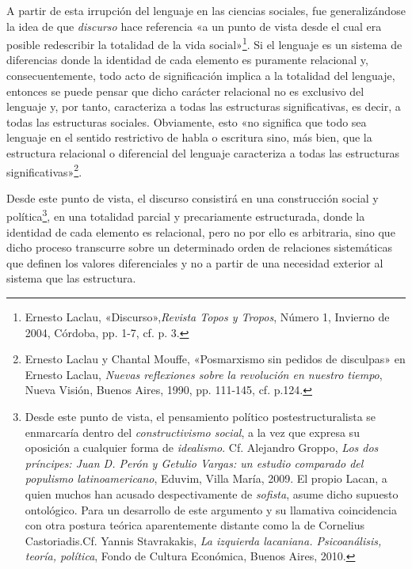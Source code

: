 A partir de esta irrupción del lenguaje en las ciencias sociales, fue generalizándose la idea de que \emph{discurso} hace referencia «a un punto de vista desde el cual era posible redescribir la totalidad de la vida social»\footnote{Ernesto Laclau, «Discurso»,\emph{Revista Topos y Tropos}, Número 1, Invierno de 2004, Córdoba, pp. 1-7, cf. p. 3.}. Si el lenguaje es un sistema de diferencias donde la identidad de cada elemento es puramente relacional y, consecuentemente, todo acto de significación implica a la totalidad del lenguaje, entonces se puede pensar que dicho carácter relacional no es exclusivo del lenguaje y, por tanto, caracteriza a todas las estructuras significativas, es decir, a todas las estructuras sociales. Obviamente, esto «no significa que todo sea lenguaje en el sentido restrictivo de habla o escritura sino, más bien, que la estructura relacional o diferencial del lenguaje caracteriza a todas las estructuras significativas»\footnote{Ernesto Laclau y Chantal Mouffe, «Posmarxismo sin pedidos de disculpas» en Ernesto Laclau, \emph{Nuevas reflexiones sobre la revolución en nuestro tiempo}, Nueva Visión, Buenos Aires, 1990, pp. 111-145, cf. p.124.}.

Desde este punto de vista, el discurso consistirá en una construcción social y política\footnote{Desde este punto de vista, el pensamiento político postestructuralista se enmarcaría dentro del \emph{constructivismo social}, a la vez que expresa su oposición a cualquier forma de \emph{idealismo}. Cf. Alejandro Groppo, \emph{Los dos príncipes: Juan D. Perón y Getulio Vargas: un estudio comparado del populismo latinoamericano}, Eduvim, Villa María, 2009. El propio Lacan, a quien muchos han acusado despectivamente de \emph{sofista}, asume dicho supuesto ontológico. Para un desarrollo de este argumento y su llamativa coincidencia con otra postura teórica aparentemente distante como la de Cornelius Castoriadis.Cf. Yannis Stavrakakis, \emph{La izquierda lacaniana. Psicoanálisis, teoría, política}, Fondo de Cultura Económica, Buenos Aires, 2010.}, en una totalidad parcial y precariamente estructurada, donde la identidad de cada elemento es relacional, pero no por ello es arbitraria, sino que dicho proceso transcurre sobre un determinado orden de relaciones sistemáticas que definen los valores diferenciales y no a partir de una necesidad exterior al sistema que las estructura.

